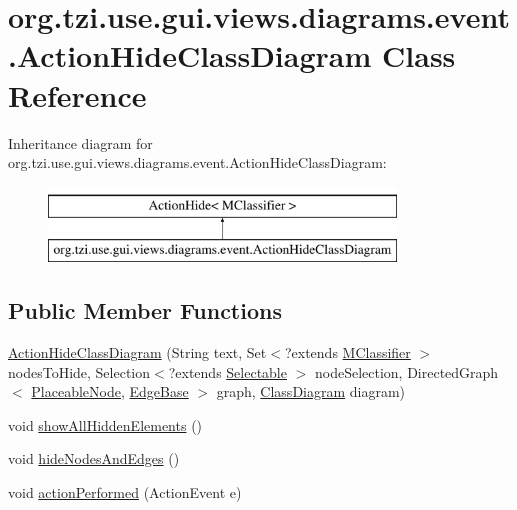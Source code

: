 \hypertarget{classorg_1_1tzi_1_1use_1_1gui_1_1views_1_1diagrams_1_1event_1_1_action_hide_class_diagram}{\section{org.\-tzi.\-use.\-gui.\-views.\-diagrams.\-event.\-Action\-Hide\-Class\-Diagram Class Reference}
\label{classorg_1_1tzi_1_1use_1_1gui_1_1views_1_1diagrams_1_1event_1_1_action_hide_class_diagram}
}
Inheritance diagram for org.\-tzi.\-use.\-gui.\-views.\-diagrams.\-event.\-Action\-Hide\-Class\-Diagram\-:\begin{figure}[H]
\begin{center}
\leavevmode
\includegraphics[height=2.000000cm]{classorg_1_1tzi_1_1use_1_1gui_1_1views_1_1diagrams_1_1event_1_1_action_hide_class_diagram}
\end{center}
\end{figure}
\subsection*{Public Member Functions}
\begin{DoxyCompactItemize}
\item 
\hyperlink{classorg_1_1tzi_1_1use_1_1gui_1_1views_1_1diagrams_1_1event_1_1_action_hide_class_diagram_ad82a348c76ead5baad913a7beee8b063}{Action\-Hide\-Class\-Diagram} (String text, Set$<$?extends \hyperlink{interfaceorg_1_1tzi_1_1use_1_1uml_1_1mm_1_1_m_classifier}{M\-Classifier} $>$ nodes\-To\-Hide, Selection$<$?extends \hyperlink{interfaceorg_1_1tzi_1_1use_1_1gui_1_1views_1_1diagrams_1_1_selectable}{Selectable} $>$ node\-Selection, Directed\-Graph$<$ \hyperlink{classorg_1_1tzi_1_1use_1_1gui_1_1views_1_1diagrams_1_1elements_1_1_placeable_node}{Placeable\-Node}, \hyperlink{classorg_1_1tzi_1_1use_1_1gui_1_1views_1_1diagrams_1_1elements_1_1edges_1_1_edge_base}{Edge\-Base} $>$ graph, \hyperlink{classorg_1_1tzi_1_1use_1_1gui_1_1views_1_1diagrams_1_1classdiagram_1_1_class_diagram}{Class\-Diagram} diagram)
\item 
void \hyperlink{classorg_1_1tzi_1_1use_1_1gui_1_1views_1_1diagrams_1_1event_1_1_action_hide_class_diagram_a65f8ce7eac1f770f1c6d0e3fc2339632}{show\-All\-Hidden\-Elements} ()
\item 
void \hyperlink{classorg_1_1tzi_1_1use_1_1gui_1_1views_1_1diagrams_1_1event_1_1_action_hide_class_diagram_a4abb3cab0e62287064ce7682d016d292}{hide\-Nodes\-And\-Edges} ()
\item 
void \hyperlink{classorg_1_1tzi_1_1use_1_1gui_1_1views_1_1diagrams_1_1event_1_1_action_hide_class_diagram_a213589ec25c441b8b5f3f133e3a34cf2}{action\-Performed} (Action\-Event e)
\end{DoxyCompactItemize}
